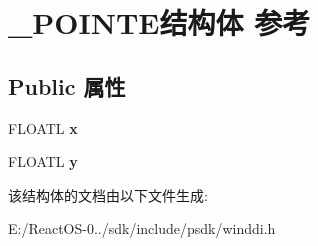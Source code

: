 \hypertarget{struct___p_o_i_n_t_e}{}\section{\+\_\+\+P\+O\+I\+N\+T\+E结构体 参考}
\label{struct___p_o_i_n_t_e}
\subsection*{Public 属性}
\begin{DoxyCompactItemize}
\item 
\mbox{\label{struct___p_o_i_n_t_e_ab140bbe484241c292f5fb996a9d430ce}} 
F\+L\+O\+A\+TL {\bfseries x}
\item 
\mbox{\label{struct___p_o_i_n_t_e_a80f63e80c7ac58d28c4deb9f6b7c47d0}} 
F\+L\+O\+A\+TL {\bfseries y}
\end{DoxyCompactItemize}


该结构体的文档由以下文件生成\+:\begin{DoxyCompactItemize}
\item 
E\+:/\+React\+O\+S-\/0../sdk/include/psdk/winddi.\+h\end{DoxyCompactItemize}
